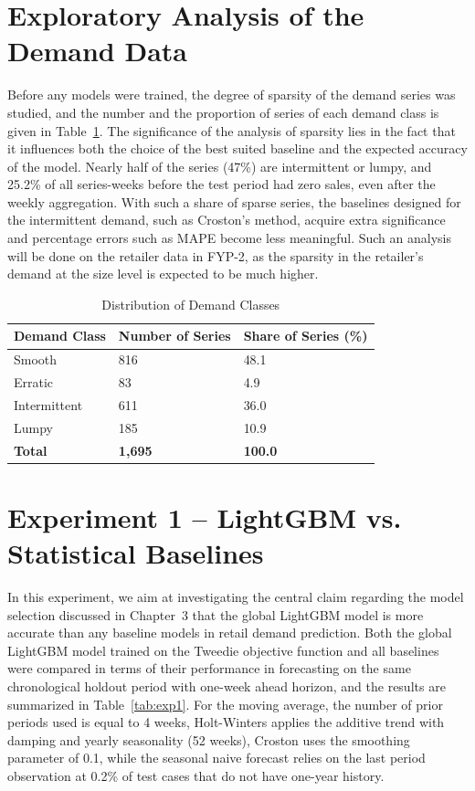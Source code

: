 \documentclass{StockSense}
\begin{document}
\section{Exploratory Analysis of the Demand Data}

Before any models were trained, the degree of sparsity of the demand series was studied, and the number and the proportion of series of each demand class is given in Table~\ref{tab:demand-classes}. The significance of the analysis of sparsity lies in the fact that it influences both the choice of the best suited baseline and the expected accuracy of the model. Nearly half of the series (47\%) are intermittent or lumpy, and 25.2\% of all series-weeks before the test period had zero sales, even after the weekly aggregation. With such a share of sparse series, the baselines designed for the intermittent demand, such as Croston's method, acquire extra significance and percentage errors such as MAPE become less meaningful. Such an analysis will be done on the retailer data in FYP-2, as the sparsity in the retailer's demand at the size level is expected to be much higher.

\begin{table}[!htbp]
\centering
\caption{Distribution of Demand Classes}
\label{tab:demand-classes}
\begin{tabular}{|l|p{3.5cm}|p{3.5cm}|}
\hline
\textbf{Demand Class} & \textbf{Number of Series} & \textbf{Share of Series (\%)} \\ \hline
Smooth & 816 & 48.1 \\ \hline
Erratic & 83 & 4.9 \\ \hline
Intermittent & 611 & 36.0 \\ \hline
Lumpy & 185 & 10.9 \\ \hline
\textbf{Total} & \textbf{1,695} & \textbf{100.0} \\ \hline
\end{tabular}
\par\vspace{3pt}{\small These are tentative results and the final results will be written in FYP-2.}
\end{table}

\section{Experiment 1 -- LightGBM vs. Statistical Baselines}

In this experiment, we aim at investigating the central claim regarding the model selection discussed in Chapter~3 that the global LightGBM model is more accurate than any baseline models in retail demand prediction. Both the global LightGBM model trained on the Tweedie objective function and all baselines were compared in terms of their performance in forecasting on the same chronological holdout period with one-week ahead horizon, and the results are summarized in Table~\ref{tab:exp1}. For the moving average, the number of prior periods used is equal to 4 weeks, Holt-Winters applies the additive trend with damping and yearly seasonality (52 weeks), Croston uses the smoothing parameter of 0.1, while the seasonal naive forecast relies on the last period observation at 0.2\% of test cases that do not have one-year history.
\end{document}
